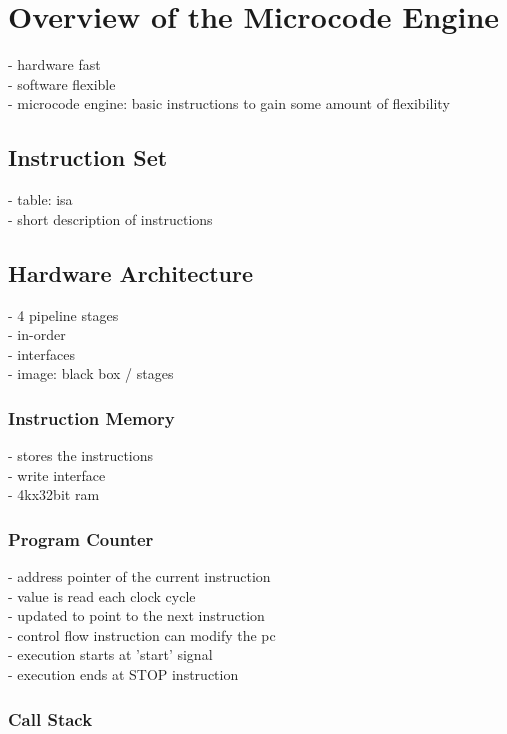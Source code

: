 \section{Overview of the Microcode Engine}
- hardware fast\\
- software flexible\\
- microcode engine: basic instructions to gain some amount of flexibility\\

\subsection{Instruction Set}
- table: isa\\
- short description of instructions\\

\subsection{Hardware Architecture}

- 4 pipeline stages\\
- in-order\\
- interfaces\\
- image: black box / stages\\

\subsubsection{Instruction Memory}

- stores the instructions\\
- write interface\\
- 4kx32bit ram\\

\subsubsection{Program Counter}

- address pointer of the current instruction\\
- value is read each clock cycle\\
- updated to point to the next instruction\\
- control flow instruction can modify the pc\\
- execution starts at 'start' signal\\
- execution ends at STOP instruction

\subsubsection{Call Stack}

